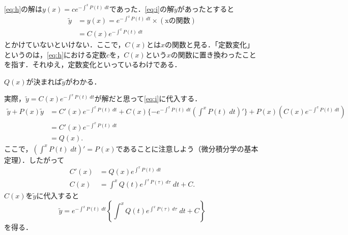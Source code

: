 \begin{note*}
    \eqref{eq:h}の解は$y(x) = ce^{-\int^{x} P(t) \; dt}$であった．\eqref{eq:i}の解$\tilde{y}$があったとすると
    \begin{align*}
        \tilde{y} &= y(x) = e^{-\int^{x} P(t) \; dt} \times (\text{xの関数}) \\
        &= C(x) e^{-\int^{x} P(t) \; dt}
    \end{align*}
    とかけていないといけない．ここで，$C(x)$とは$x$の関数と見る．「定数変化」というのは，\eqref{eq:h}における定数$c$を，$C(x)$という$x$の関数に置き換わったことを指す．それゆえ，定数変化といっているわけである．
\end{note*}

\begin{remark}
    $Q(x)$が決まれば$\tilde{y}$がわかる．
\end{remark}

実際，$\tilde{y}=C(x)e^{-\int^{x} P(t) \; dt}$が解だと思って\eqref{eq:i}に代入する．
\begin{align*}
    \tilde{y} + P(x)\tilde{y} &= C'(x)e^{-\int^{x} P(t) \; dt} + C(x)\{-e^{-\int^{x} P(t) \; dt} (\int^x P(t) \; dt)' \} + P(x) (C(x)e^{-\int^{x} P(t) \; dt}) \\
    &= C'(x) e^{-\int^{x} P(t) \; dt} \\
    &= Q(x).
\end{align*}
ここで，$(\int^x P(t) \; dt)' = P(x)$であることに注意しよう（微分積分学の基本定理）．したがって
\begin{align*}
    C'(x) &= Q(x) e^{\int^{x} P(t) \; dt} \\
    C(x) &= \int^x  Q(t) e^{\int^{x} P(\tau) \; d\tau} \; dt + C.
\end{align*}
$C(x)$を$\tilde{y}$に代入すると
\[ \tilde{y} = e^{-\int^{x} P(t) \; dt} \left\{ \int^x Q(t) e^{\int^{x} P(\tau) \; d\tau} \; dt + C\right\}\]
を得る．

